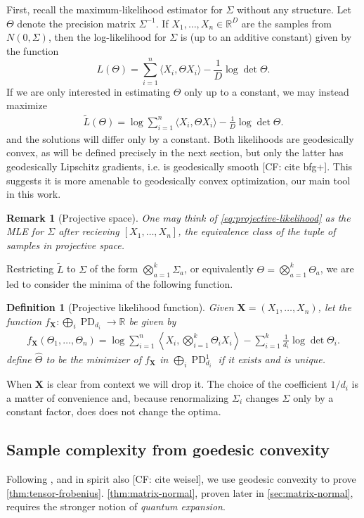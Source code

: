 \documentclass{article}
\newtheorem{remark}{Remark}
\newtheorem{definition}{Definition}
\newcommand{\R}{{\mathbb{R}}}
\renewcommand{\vec}{\bm}
\newcommand\PD{\operatorname{PD}}
\newcommand{\CF}[1]{{\color{purple}[CF: #1]}}
\begin{document}
First, recall the maximum-likelihood estimator for $\Sigma$ without any structure. Let $\Theta$ denote the precision matrix $\Sigma^{-1}$. If $X_1, \dots, X_n \in \R^D$ are the samples from $N(0, \Sigma)$, then the log-likelihood for $\Sigma$ is (up to an additive constant) given by the function 
$$L(\Theta) = \sum_{i = 1}^n \langle X_i,  \Theta X_i\rangle - \frac{1}{D} \log\det \Theta.$$
If we are only interested in estimating $\Theta$ only up to a constant, we may instead maximize 
\begin{gather}\tilde{L}(\Theta) = \log \sum_{i = 1}^n \langle X_i, \Theta X_i\rangle - \frac{1}{D} \log\det \Theta. \label{eq:projective-likelihood}\end{gather}
and the solutions will differ only by a constant. Both likelihoods are geodesically convex, as will be defined precisely in the next section, but only the latter has geodesically Lipschitz gradients, i.e. is geodesically smooth \CF{cite bfg+}. This suggests it is more amenable to geodesically convex optimization, our main tool in this work.
\begin{remark}[Projective space] One may think of \cref{eq:projective-likelihood} as the MLE for $\Sigma$ after recieving $[X_1, \dots, X_n]$, the equivalence class of the tuple of samples in projective space.
\end{remark}
Restricting $\tilde{L}$ to $\Sigma$ of the form $\bigotimes_{a = 1}^{k} \Sigma_a$, or equivalently $\Theta = \bigotimes_{a = 1}^{k} \Theta_a$, we are led to consider the minima of the following function. 
\begin{definition}[Projective likelihood function]\label{dfn:function}
Given $\vec{X} = (X_1, \dots, X_n)$, let the function $f_{\vec X}:\bigoplus_{i} \PD_{d_i} \to \R$ be given by 
\begin{gather}f_{\vec X}(\Theta_1, \dots, \Theta_n) = \log \sum_{i = 1}^n \left\langle X_i,  \bigotimes_{i = 1}^k \Theta_i X_i\right\rangle - \sum_{i = 1}^k \frac{1}{d_i} \log\det \Theta_i. \label{eq:projective-likelihood}\end{gather}
define $\widehat{\Theta}$ to be the minimizer of $f_{\vec X}$ in $\bigoplus_{i} \PD_{d_i}^1$ if it exists and is unique.
\end{definition}
When $\vec X$ is clear from context we will drop it. 
The choice of the coefficient $1/d_i$ is a matter of convenience and, because renormalizing $\Sigma_i$ changes $\Sigma$ only by a constant factor, does does not change the optima.


\subsection{Sample complexity from goedesic convexity}\label{subsec:outline} Following \cite{FM20}, and in spirit also \CF{cite weisel}, we use geodesic convexity to prove \cref{thm:tensor-frobenius}. \cref{thm:matrix-normal}, proven later in \cref{sec:matrix-normal}, requires the stronger notion of \emph{quantum expansion}.
\end{document}
